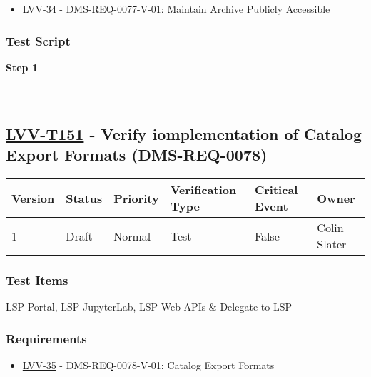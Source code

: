 \begin{itemize}
\tightlist
\item
  \href{https://jira.lsstcorp.org/browse/LVV-34}{LVV-34} -
  DMS-REQ-0077-V-01: Maintain Archive Publicly Accessible
\end{itemize}

\hypertarget{test-script-50}{%
\subsubsection{Test Script}\label{test-script-50}}

\textbf{Step 1}\\
~\\
~\\

\hypertarget{lvv-t151---verify-iomplementation-of-catalog-export-formats-dms-req-0078}{%
\subsection{\texorpdfstring{\href{https://jira.lsstcorp.org/secure/Tests.jspa\#/testCase/LVV-T151}{LVV-T151}
- Verify iomplementation of Catalog Export Formats
(DMS-REQ-0078)}{LVV-T151 - Verify iomplementation of Catalog Export Formats (DMS-REQ-0078)}}\label{lvv-t151---verify-iomplementation-of-catalog-export-formats-dms-req-0078}}

\begin{longtable}[]{@{}llllll@{}}
\toprule
Version & Status & Priority & Verification Type & Critical Event &
Owner\tabularnewline
\midrule
\endhead
1 & Draft & Normal & Test & False & Colin Slater\tabularnewline
\bottomrule
\end{longtable}

\hypertarget{test-items-51}{%
\subsubsection{Test Items}\label{test-items-51}}

LSP Portal, LSP JupyterLab, LSP Web APIs \& Delegate to LSP

\hypertarget{requirements-51}{%
\subsubsection{Requirements}\label{requirements-51}}

\begin{itemize}
\tightlist
\item
  \href{https://jira.lsstcorp.org/browse/LVV-35}{LVV-35} -
  DMS-REQ-0078-V-01: Catalog Export Formats
\end{itemize}

